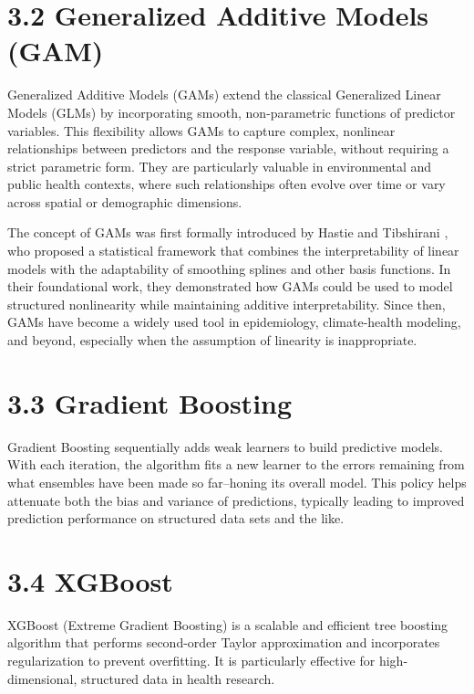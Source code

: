 \documentclass[
]{krantz}
\begin{document}
\section{3.2 Generalized Additive Models (GAM)}\label{generalized-additive-models-gam}

Generalized Additive Models (GAMs) extend the classical Generalized Linear Models (GLMs) by incorporating smooth, non-parametric functions of predictor variables. This flexibility allows GAMs to capture complex, nonlinear relationships between predictors and the response variable, without requiring a strict parametric form. They are particularly valuable in environmental and public health contexts, where such relationships often evolve over time or vary across spatial or demographic dimensions.

The concept of GAMs was first formally introduced by Hastie and Tibshirani \citep{hastie1986}, who proposed a statistical framework that combines the interpretability of linear models with the adaptability of smoothing splines and other basis functions. In their foundational work, they demonstrated how GAMs could be used to model structured nonlinearity while maintaining additive interpretability. Since then, GAMs have become a widely used tool in epidemiology, climate-health modeling, and beyond, especially when the assumption of linearity is inappropriate.

\section{3.3 Gradient Boosting}\label{gradient-boosting}

Gradient Boosting sequentially adds weak learners to build predictive models. With each iteration, the algorithm fits a new learner to the errors remaining from what ensembles have been made so far--honing its overall model. This policy helps attenuate both the bias and variance of predictions, typically leading to improved prediction performance on structured data sets and the like.

\section{3.4 XGBoost}\label{xgboost}

XGBoost (Extreme Gradient Boosting) is a scalable and efficient tree boosting algorithm that performs second-order Taylor approximation and incorporates regularization to prevent overfitting. It is particularly effective for high-dimensional, structured data in health research.\citep{chen2016xgboost}
\end{document}
